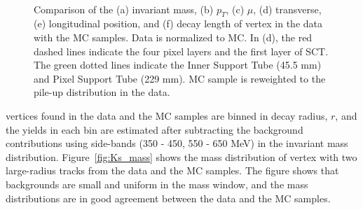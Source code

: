 \begin{figure}[!htb]
     \\
    \caption{Comparison of the (a) invariant mass, (b) $p_{T}$, (c) $\mu$, (d) transverse, (e) longitudinal position, and (f) decay length of \Ks vertex in the data with the MC samples. Data is normalized to MC. In (d), the red dashed lines indicate the four pixel layers and the first layer of SCT. The green dotted lines indicate the Inner Support Tube (45.5 mm) and Pixel Support Tube (229 mm). MC sample is reweighted to the pile-up distribution in the data.}
    \label{fig:Ks_data_MC}
\end{figure}

\Ks vertices found in the data and the MC samples are binned in decay radius, $r$, and the \Ks yields in each bin are estimated after subtracting the background contributions using side-bands (350 - 450, 550 - 650 MeV) in the invariant mass distribution. Figure~\ref{fig:Ks_mass} shows the mass distribution of \Ks vertex with two large-radius tracks from the data and the MC samples. The figure shows that backgrounds are small and uniform in the mass window, and the mass distributions are in good agreement between the data and the MC samples.

